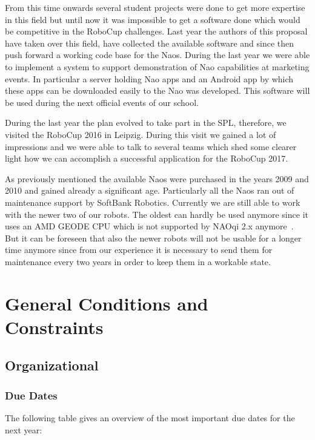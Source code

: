 \documentclass[12pt]{article}
\theoremstyle{definition}
\begin{document}
From this time onwards several student projects were done to get more expertise in this field but until now it was impossible to get a software done which would be competitive in the RoboCup challenges. Last year the authors of this proposal have taken over this field, have collected the available software and since then push forward a working code base for the Naos. During the last year we were able to implement a system to support demonstration of Nao capabilities at marketing events. In particular a server holding Nao apps and an Android app by which these apps can be downloaded easily to the Nao was developed. This software will be used during the next official events of our school.

During the last year the plan evolved to take part in the SPL, therefore, we visited the RoboCup 2016 in Leipzig. During this visit we gained a lot of impressions and we were able to talk to several teams which shed some clearer light how we can accomplish a successful application for the RoboCup 2017.

As previously mentioned the available Naos were purchased in the years 2009 and 2010 and gained already a significant age. Particularly all the Naos ran out of maintenance support by SoftBank Robotics. Currently we are still able to work with the newer two of our robots. The oldest can hardly be used anymore since it uses an AMD GEODE CPU which is not supported by NAOqi 2.x anymore~\cite{inbar_new_2014}. But it can be foreseen that also the newer robots will not be usable for a longer time anymore since from our experience it is necessary to send them for maintenance every two years in order to keep them in a workable state.

 
\section{General Conditions and Constraints}
\subsection{Organizational}
\subsubsection{Due Dates}
The following table gives an overview of the most important due dates for the next year:
\end{document}
